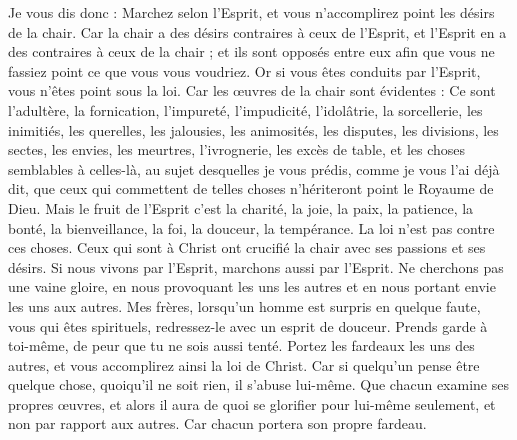 \begin{multicols}{2}
Je vous dis donc : Marchez selon l'Esprit, et vous n’accomplirez point les désirs de la chair.
Car la chair a des désirs contraires à ceux de l'Esprit, et l'Esprit en a des contraires à ceux de la chair ; et ils sont opposés entre eux afin que vous ne fassiez point ce que vous vous voudriez.
Or si vous êtes conduits par l'Esprit, vous n'êtes point sous la loi.
Car les œuvres de la chair sont évidentes : Ce sont l'adultère, la fornication, l’impureté, l'impudicité,
l’idolâtrie, la sorcellerie, les inimitiés, les querelles, les jalousies, les animosités, les disputes, les divisions, les sectes,
les envies, les meurtres, l’ivrognerie, les excès de table, et les choses semblables à celles-là, au sujet desquelles je vous prédis, comme je vous l'ai déjà dit, que ceux qui commettent de telles choses n'hériteront point le Royaume de Dieu.
Mais le fruit de l'Esprit c’est la charité, la joie, la paix, la patience, la bonté, la bienveillance, la foi, la douceur, la tempérance.
La loi n’est pas contre ces choses.
Ceux qui sont à Christ ont crucifié la chair avec ses passions et ses désirs.
Si nous vivons par l'Esprit, marchons aussi par l'Esprit.
Ne cherchons pas une vaine gloire, en nous provoquant les uns les autres et en nous portant envie les uns aux autres.
\VerseOne{}Mes frères, lorsqu'un homme est surpris en quelque faute, vous qui êtes spirituels, redressez-le avec un esprit de douceur. Prends garde à toi-même, de peur que tu ne sois aussi tenté.
Portez les fardeaux les uns des autres, et vous accomplirez ainsi la loi de Christ.
Car si quelqu'un pense être quelque chose, quoiqu'il ne soit rien, il s’abuse lui-même.
Que chacun examine ses propres œuvres, et alors il aura de quoi se glorifier pour lui-même seulement, et non par rapport aux autres.
Car chacun portera son propre fardeau.

\end{multicols}
